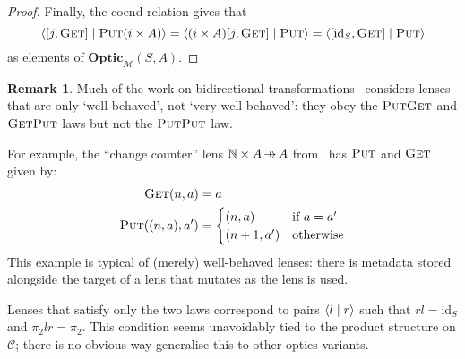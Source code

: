 \documentclass[11pt,letterpaper]{article}
\theoremstyle{plain}
\theoremstyle{definition}
\newtheorem{example}[theorem]{Example}
\newtheorem{remark}[theorem]{Remark}
\newcommand{\C}{\mathscr{C}}
\newcommand{\M}{\mathscr{M}}
\newcommand{\bN}{\mathbb{N}}
\newcommand{\Optic}{\mathbf{Optic}}
\newcommand{\id}{\mathrm{id}}
\newcommand{\rep}[2]{{\ensuremath \left\langle #1 \mid #2 \right\rangle}}
\newcommand{\fget}{\textsc{Get}}
\newcommand{\fput}{\textsc{Put}}
\newcommand{\hto}{\ensuremath{\,\mathaccent\shortmid\rightarrow\,}}
\begin{document}
\begin{proof}
  Finally, the coend relation gives that \[\rep{[j,\fget]}{\fput (i \times A)} = \rep{(i \times A)[j,\fget]}{\fput} = \rep{[\id_S, \fget]}{\fput}\] as elements of $\Optic_\M(S, A)$.
\end{proof}

\begin{remark}
Much of the work on bidirectional transformations~\cite{CombinatorsForBidirectionalTreeTransformations} considers lenses that are only `well-behaved', not `very well-behaved': they obey the $\fput\fget$ and $\fget\fput$ laws but not the $\fput\fput$ law.

For example, the ``change counter'' lens $\bN \times A \hto A$ from~\cite{AClearPictureOfLensLaws} has $\fput$ and $\fget$ given by:
  \begin{align*}
    \fget(n, a) &= a \\
    \fput((n, a), a') &= \begin{cases}
      (n, a) & \text{if } a = a' \\
      (n+1, a') & \text{otherwise}
    \end{cases}
  \end{align*}
  This example is typical of (merely) well-behaved lenses: there is metadata stored alongside the target of a lens that mutates as the lens is used.

Lenses that satisfy only the two laws correspond to pairs $\rep{l}{r}$ such that $rl = \id_S$ and $\pi_2lr = \pi_2$. This condition seems unavoidably tied to the product structure on $\C$; there is no obvious way generalise this to other optics variants.
\end{remark}

\end{document}

